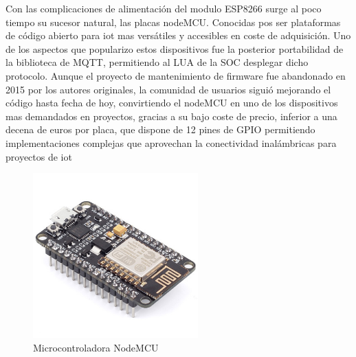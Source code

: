 \vspace{1.5cm}

Con las complicaciones de alimentación del modulo ESP8266 surge al poco tiempo su sucesor natural, las placas nodeMCU. Conocidas pos ser plataformas de código abierto para \gls{iot} mas versátiles y accesibles en coste de adquisición. Uno de los aspectos que popularizo estos dispositivos fue la posterior portabilidad de la biblioteca de MQTT, permitiendo  al LUA de la SOC desplegar dicho protocolo. Aunque el proyecto de mantenimiento de firmware fue abandonado en 2015 por los autores originales, la comunidad de usuarios siguió mejorando el código hasta fecha de hoy, convirtiendo el nodeMCU en uno de los dispositivos mas demandados en proyectos, gracias a su bajo coste de precio, inferior a una decena de euros por placa, que dispone de 12 pines de GPIO permitiendo implementaciones complejas que aprovechan la conectividad inalámbricas para proyectos de \gls{iot}

\begin{figure}[hbt!]
\centering
\includegraphics[height=2.5in]{figures/nodemcu.jpg}
\caption[captura de una nodeMCU]{Microcontroladora NodeMCU\footnotemark}
\end{figure}

